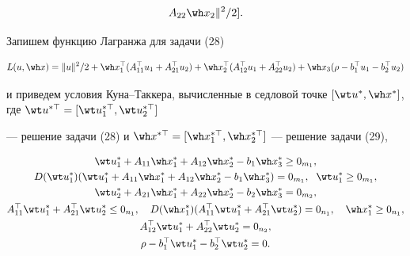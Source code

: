 \begin{pf}
\begin{equation}
A_{22}\wh x_2\|^2/2].


\end{equation}


Запишем функцию Лагранжа для задачи (28)


$$


L(u,\wh x)=\|u\|^2/2+\wh x^\top_1(A^\top_{11}u_1+A^\top_{21}u_2)+


\wh x^\top_2(A^\top_{12}u_1+A^\top_{22}u_2)+


\wh x_3(\rho-b^\top_1u_1-b^\top_2u_2)


$$


и приведем условия Куна--Таккера, вычисленные в седловой точке $[\wt 


u^*,\wh x^*]$, где $\wt u^{*\top}=[\wt u^{*\top}_1,\wt u^{*\top}_2]$


--- решение задачи (28) и $\wh x^{*\top}=[\wh x^{*\top}_1,\wh 


x^{*\top}_2]$ --- решение задачи (29),


\begin{gather}


\wt u^*_1+A_{11}\wh x^*_1+A_{12}\wh x^*_2-b_1\wh x^*_3\ge0_{m_1},\\


%


D(\wt u^*_1)(\wt u^*_1+A_{11}\wh x^*_1+A_{12}\wh x^*_2-


b_1\wh x^*_3)=0_{m_1},\ \; \wt u^*_1\ge0_{m_1},\\


%


\wt u^*_2+A_{21}\wh x^*_1+A_{22}\wh x^*_2-


b_2\wh x^*_3=0_{m_2},\\


%


A^\top_{11}\wt u^*_1+A^\top_{21}\wt u^*_2\le0_{n_1},\quad


D(\wh x^*_1)(A^\top_{11}\wt u^*_1+A^\top_{21}\wt u^*_2)=


0_{n_1},\quad \wh x^*_1\ge0_{n_1},\\


%


A^\top_{12}\wt u^*_1+A^\top_{22}\wt u^*_2=0_{n_2},\\


%


\rho-b^\top_1\wt u^*_1-b^\top_2\wt u^*_2=0.


\end{gather}






\end{pf}
